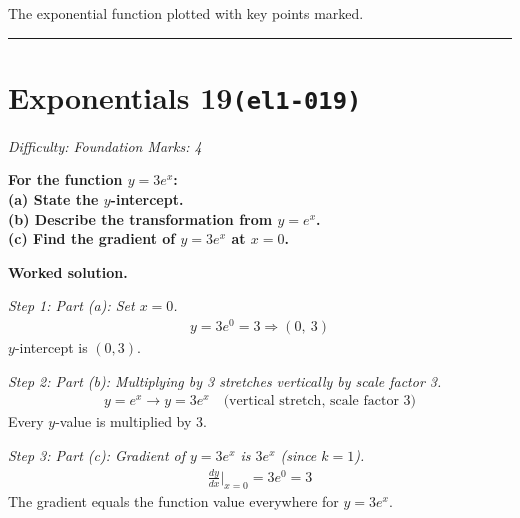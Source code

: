 \documentclass[11pt]{article}
\newcommand{\question}[1]{\par\medskip\noindent\textbf{#1}\par}
\begin{document}
\begin{center}
{
}
\end{center}
\small The exponential function plotted with key points marked.\normalsize

\medskip\hrule

\section*{Exponentials 19\quad\small\texttt{(el1-019)}}
\textit{Difficulty: Foundation \quad\textbar\quad Marks: 4}

\question{For the function \( y = 3e^x \):  \\[3pt]  (a) State the \( y \)-intercept.  \\[3pt]  (b) Describe the transformation from \( y = e^x \).  \\[3pt]  (c) Find the gradient of \( y = 3e^x \) at \( x = 0 \).}

\textbf{Worked solution.}

\textit{Step 1: Part (a): Set \( x = 0 \).}
\[\begin{gathered}
y = 3e^0 = 3 \Rightarrow (0,\ 3)
\end{gathered}\]
\( y \)-intercept is \( (0, 3) \).

\textit{Step 2: Part (b): Multiplying by 3 stretches vertically by scale factor 3.}
\[\begin{gathered}
y = e^x \to y = 3e^x \quad \text{(vertical stretch, scale factor 3)}
\end{gathered}\]
Every \( y \)-value is multiplied by 3.

\textit{Step 3: Part (c): Gradient of \( y = 3e^x \) is \( 3e^x \) (since \( k = 1 \)).}
\[\begin{gathered}
\frac{dy}{dx}\Big|_{x=0} = 3e^0 = 3
\end{gathered}\]
The gradient equals the function value everywhere for \( y = 3e^x \).
\end{document}
